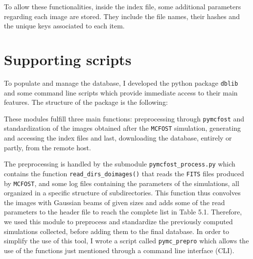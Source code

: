 \documentclass[a4paper,10pt]{report}
\begin{document}
To allow these functionalities, inside the index file, some additional parameters regarding each image are stored.
They include the file names, their hashes and the unique keys associated to each item.

\section{Supporting scripts}

To populate and manage the database, I developed the python package \lstinline{dblib}
and some command line scripts which provide immediate access to their main features.
The structure of the package is the following:

\begin{minipage}{\textwidth}
\end{minipage}

These modules fulfill three main functions: preprocessing through \lstinline{pymcfost} and standardization
of the images obtained after the \lstinline{MCFOST} simulation, generating and accessing
the index files and last, downloading the database, entirely or partly, from the remote host.

The preprocessing is handled by the submodule \lstinline{pymcfost_process.py} which contains the function 
\lstinline{read_dirs_doimages()} that reads the \lstinline{FITS} files produced by \lstinline{MCFOST},
and some log files containing the parameters of the simulations, all  organized in a specific structure of subdirectories.
This function thus convolves the images with Gaussian beams of given sizes and adds some of the read parameters to the header
file to reach the complete list in Table 5.1.
Therefore, we used this module to preprocess and standardize the previously computed
simulations collected, before adding them to the final database.
In order to simplify the use of this tool, I wrote a script called \lstinline{pymc_prepro} which
allows the use of the functions just mentioned through a command line interface (CLI).
\end{document}
